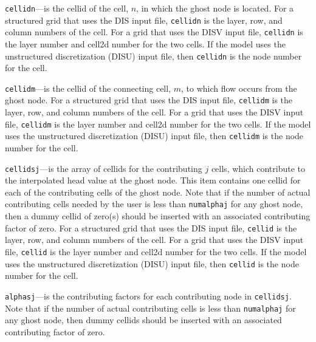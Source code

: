 \begin{description}
\item \texttt{cellidn}---is the cellid of the cell, $n$, in which the ghost node is located. For a structured grid that uses the DIS input file, \texttt{cellidn} is the layer, row, and column numbers of the cell.   For a grid that uses the DISV input file, \texttt{cellidn} is the layer number and cell2d number for the two cells.  If the model uses the unstructured discretization (DISU) input file, then \texttt{cellidn} is the node number for the cell.

\item \texttt{cellidm}---is the cellid of the connecting cell, $m$, to which flow occurs from the ghost node. For a structured grid that uses the DIS input file, \texttt{cellidm} is the layer, row, and column numbers of the cell.   For a grid that uses the DISV input file, \texttt{cellidm} is the layer number and cell2d number for the two cells.  If the model uses the unstructured discretization (DISU) input file, then \texttt{cellidm} is the node number for the cell.

\item \texttt{cellidsj}---is the array of cellids for the contributing $j$ cells,  which contribute to the interpolated head value at the ghost node. This item contains one cellid for each of the contributing cells of the ghost node. Note that if the number of actual contributing cells needed by the user is less than \texttt{numalphaj} for any ghost node, then a dummy cellid of zero(s) should be inserted with an associated contributing factor of zero. For a structured grid that uses the DIS input file, \texttt{cellid} is the layer, row, and column numbers of the cell.   For a grid that uses the DISV input file, \texttt{cellid} is the layer number and cell2d number for the two cells.  If the model uses the unstructured discretization (DISU) input file, then \texttt{cellid} is the node number for the cell.

\item \texttt{alphasj}---is the contributing factors for each contributing node in \texttt{cellidsj}. Note that if the number of actual contributing cells is less than \texttt{numalphaj} for any ghost node, then dummy cellids should be inserted with an associated contributing factor of zero.

\end{description}

